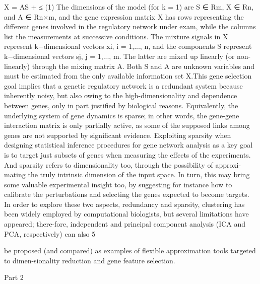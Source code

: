 \documentclass[11pt]{article}
\begin{document}
X = AS + ≤ (1) The dimensions of the model (for k = 1) are S ∈ Rm, X ∈ Rn, and A ∈ Rn×m, and the gene expression matrix X has rows representing the different genes involved in the regulatory network under exam, while the columns list the measurements at successive conditions. The mixture signals in X represent k−dimensional vectors xi, i = 1,..., n, and the components S represent k−dimensional vectors sj, j = 1,..., m. The latter are mixed up linearly (or non-linearly) through the mixing matrix A. Both S and A are unknown variables and must be estimated from the only available information set X.This gene selection goal implies that a genetic regulatory network is a redundant system because inherently noisy, but also owing to the high-dimensionality and dependence between genes, only in part justified by biological reasons. Equivalently, the underlying system of gene dynamics is sparse; in other words, the gene-gene interaction matrix is only partially active, as some of the supposed links among genes are not supported by significant evidence. Exploiting sparsity when designing statistical inference procedures for gene network analysis as a key goal is to target just subsets of genes when measuring the effects of the experiments. And sparsity refers to dimensionality too, through the possibility of approxi-mating the truly intrinsic dimension of the input space. In turn, this may bring some valuable experimental insight too, by suggesting for instance how to calibrate the perturbations and selecting the genes expected to become targets. In order to explore these two aspects, redundancy and sparsity, clustering has been widely employed by computational biologists, but several limitations have appeared; there-fore, independent and principal component analysis (ICA and PCA, respectively) can also 5

be proposed (and compared) as examples of flexible approximation tools targeted to dimen-sionality reduction and gene feature selection.

Part 2
\end{document}
